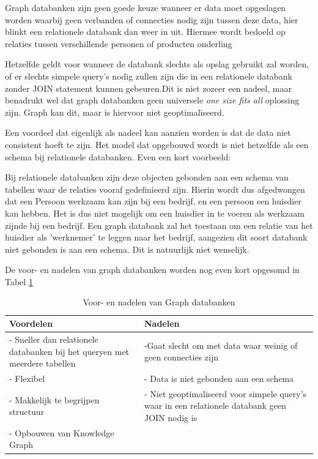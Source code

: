 Graph databanken zijn geen goede keuze wanneer er data moet opgeslagen worden waarbij geen verbanden of connecties nodig zijn tussen deze data, hier blinkt een relationele databank dan weer in uit.  Hiermee wordt bedoeld op relaties tussen verschillende personen of producten onderling

Hetzelfde geldt voor wanneer de databank slechts als opslag gebruikt zal worden, of er slechts simpele query's nodig zullen zijn die in een relationele databank zonder JOIN statement kunnen gebeuren.Dit is niet zozeer een nadeel, maar benadrukt wel dat graph databanken geen universele \textit{one size fits all} oplossing zijn. Graph kan dit, maar is hiervoor niet geoptimaliseerd.

Een voordeel dat eigenlijk als nadeel kan aanzien worden is dat de data niet consistent hoeft te zijn. Het model dat opgebouwd wordt is niet hetzelfde als een schema bij relationele databanken. Even een kort voorbeeld:

Bij relationele databanken zijn deze objecten gebonden aan een schema van tabellen waar de relaties vooraf gedefinieerd zijn. Hierin wordt dus afgedwongen dat een Persoon werkzaam kan zijn bij een bedrijf, en een persoon een huisdier kan hebben. Het is dus niet mogelijk om een huisdier in te voeren als werkzaam zijnde bij een bedrijf.
Een graph databank zal het toestaan om een relatie van het huisdier als 'werknemer' te leggen naar het bedrijf, aangezien dit soort databank niet gebonden is aan een schema. Dit is natuurlijk niet wenselijk.

De voor- en nadelen van graph databanken worden nog even kort opgesomd in Tabel \ref{tab:procongraph}

\begin{table}
	\begin{tabularx}{\textwidth}{|X|X|}
		\hline
		\textbf{Voordelen} & \textbf{Nadelen}  \\ 
		\hline
		 - Sneller dan relationele databanken bij het queryen met meerdere tabellen & -Gaat slecht om met data waar weinig of geen connecties zijn \\ 
		- Flexibel & - Data is niet gebonden aan een schema \\
		- Makkelijk te begrijpen structuur & - Niet geoptimaliseerd voor simpele query's waar in een relationele databank geen JOIN nodig is \\ 
		- Opbouwen van Knowledge Graph & \\
		\hline
	\end{tabularx}
 \caption[Voor- en nadelen van Graph databanken]{Voor- en nadelen van Graph databanken}
 \label{tab:procongraph}
\end{table}

